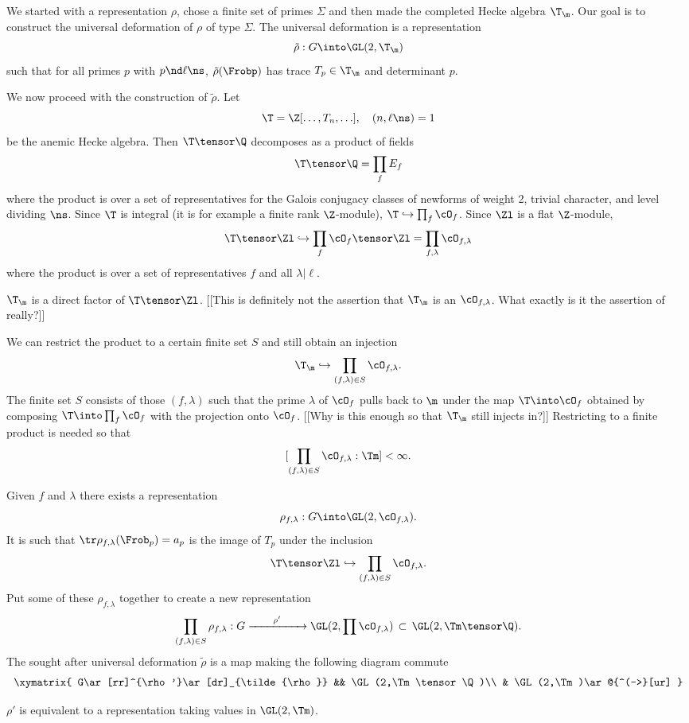 \documentclass{report}
\begin{document}
We started with a representation $\rho$, chose a finite set of primes
$\Sigma$ and then made the completed Hecke algebra $\T_{\m}$. Our goal
is to construct the universal deformation of $\rho$ of type $\Sigma$.
The universal deformation is a representation
$$\tilde{\rho}:G\into\GL(2,\T_{\m})$$
such that for all primes $p$ with $p\nd\ell\ns$,
$\tilde{\rho}(\Frobp)$ has trace $T_p\in\T_{\m}$ and determinant $p$.

We now proceed with the construction of $\tilde{\rho}$.
Let $$\T=\Z[\ldots,T_n,\ldots], \quad (n,\ell\ns)=1$$
be the anemic Hecke algebra. Then $\T\tensor\Q$ decomposes as
a product of fields
$$\T\tensor\Q=\prod_{f} E_f$$
where the product is over a set of representatives for the Galois
conjugacy classes of newforms of weight 2,
trivial character, and
level dividing $\ns$. Since $\T$ is integral (it is for example a finite
rank $\Z$-module), $\T\hookrightarrow\prod_{f}\cO_{f}$.
Since $\Zl$ is a flat $\Z$-module,
$$\T\tensor\Zl\hookrightarrow \prod_{f}\cO_f\tensor\Zl
=\prod_{f,\lambda}\cO_{f,\lambda}$$
where the product is over a set of representatives $f$
and all $\lambda|\ell$.

$\T_{\m}$ is a direct factor of $\T\tensor\Zl$.
[[This is definitely not the assertion that $\T_{\m}$ is an
$\cO_{f,\lambda}$. What exactly is it the assertion of really?]]

We can restrict the product to a certain finite set
$S$ and still obtain an injection
$$\T_{\m}\hookrightarrow \prod_{(f,\lambda)\in S} \cO_{f,\lambda}.$$
The finite set $S$ consists of those $(f,\lambda)$ such that
the prime $\lambda$ of $\cO_f$ pulls back to $\m$ under
the map $\T\into\cO_f$ obtained by composing
$\T\into\prod_f\cO_f$ with the projection onto $\cO_f$.
[[Why is this enough so that $\T_{\m}$ still injects in?]]
Restricting to a finite product is needed so that
$$[\prod_{(f,\lambda)\in S}\cO_{f,\lambda}:\Tm]<\infty.$$

Given $f$ and $\lambda$ there exists a representation
$$\rho_{f,\lambda}:G\into\GL(2,\cO_{f,\lambda}).$$
It is such that
$\tr \rho_{f,\lambda}(\Frob_p)=a_p$ is
the image of $T_p$ under the inclusion
$$\T\tensor\Zl\hookrightarrow\prod_{(f,\lambda)\in S}\cO_{f,\lambda}.$$
Put some of these $\rho_{f,\lambda}$ together to create
a new representation
$$\prod_{(f,\lambda)\in S}\rho_{f,\lambda}:
           G\xrightarrow{\qquad\rho'\qquad}\GL(2,\prod\cO_{f,\lambda})
                  \,\subset\, \GL(2,\Tm\tensor\Q).$$
The sought after universal
deformation $\tilde{\rho}$ is a map making
the following diagram commute
$$\xymatrix{
   G\ar[rr]^{\rho'}\ar[dr]_{\tilde{\rho}} && \GL(2,\Tm\tensor\Q)\\
                       & \GL(2,\Tm)\ar@{^(->}[ur]
}$$
\begin{theorem}
   $\rho'$ is equivalent to a representation taking values
   in $\GL(2,\Tm)$.
\end{theorem}
\end{document}
